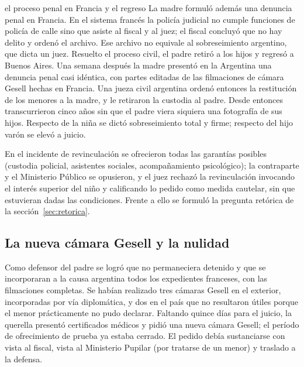 \documentclass[12pt,oneside]{book}
\begin{document}
\begin{ejemplo}{el proceso penal en Francia y el regreso}
La madre formuló además una denuncia penal en Francia. En el sistema francés la policía judicial no cumple funciones de policía de calle sino que asiste al fiscal y al juez; el fiscal concluyó que no hay delito y ordenó el archivo. Ese archivo no equivale al sobreseimiento argentino, que dicta un juez. Resuelto el proceso civil, el padre retiró a los hijos y regresó a Buenos Aires. Una semana después la madre presentó en la Argentina una denuncia penal casi idéntica, con partes editadas de las filmaciones de cámara Gesell hechas en Francia. Una jueza civil argentina ordenó entonces la restitución de los menores a la madre, y le retiraron la custodia al padre. Desde entonces transcurrieron cinco años sin que el padre viera siquiera una fotografía de sus hijos. Respecto de la niña se dictó sobreseimiento total y firme; respecto del hijo varón se elevó a juicio.
\end{ejemplo}

En el incidente de revinculación se ofrecieron todas las garantías posibles (custodia policial, asistentes sociales, acompañamiento psicológico); la contraparte y el Ministerio Público se opusieron, y el juez rechazó la revinculación invocando el interés superior del niño y calificando lo pedido como medida cautelar, sin que estuvieran dadas las condiciones. Frente a ello se formuló la pregunta retórica de la sección~\ref{sec:retorica}.

\subsection{La nueva cámara Gesell y la nulidad}

Como defensor del padre se logró que no permaneciera detenido y que se incorporaran a la causa argentina todos los expedientes franceses, con las filmaciones completas. Se habían realizado tres cámaras Gesell en el exterior, incorporadas por vía diplomática, y dos en el país que no resultaron útiles porque el menor prácticamente no pudo declarar. Faltando quince días para el juicio, la querella presentó certificados médicos y pidió una nueva cámara Gesell; el período de ofrecimiento de prueba ya estaba cerrado. El pedido debía sustanciarse con vista al fiscal, vista al Ministerio Pupilar (por tratarse de un menor) y traslado a la defensa.
\end{document}
